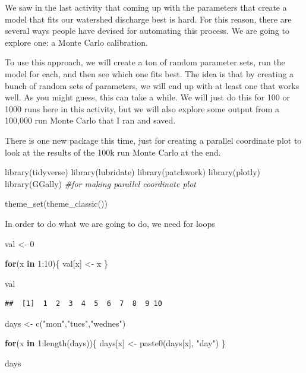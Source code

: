 \documentclass[
]{book}
\newenvironment{Shaded}{\begin{snugshade}}{\end{snugshade}}
\newcommand{\CommentTok}[1]{\textcolor[rgb]{0.56,0.35,0.01}{\textit{#1}}}
\newcommand{\ControlFlowTok}[1]{\textcolor[rgb]{0.13,0.29,0.53}{\textbf{#1}}}
\newcommand{\DecValTok}[1]{\textcolor[rgb]{0.00,0.00,0.81}{#1}}
\newcommand{\FunctionTok}[1]{\textcolor[rgb]{0.00,0.00,0.00}{#1}}
\newcommand{\NormalTok}[1]{#1}
\newcommand{\OtherTok}[1]{\textcolor[rgb]{0.56,0.35,0.01}{#1}}
\newcommand{\SpecialCharTok}[1]{\textcolor[rgb]{0.00,0.00,0.00}{#1}}
\newcommand{\StringTok}[1]{\textcolor[rgb]{0.31,0.60,0.02}{#1}}
\begin{document}
We saw in the last activity that coming up with the parameters that create a model that fits our watershed discharge best is hard. For this reason, there are several ways people have devised for automating this process. We are going to explore one: a Monte Carlo calibration.

To use this approach, we will create a ton of random parameter sets, run the model for each, and then see which one fits best. The idea is that by creating a bunch of random sets of parameters, we will end up with at least one that works well. As you might guess, this can take a while. We will just do this for 100 or 1000 runs here in this activity, but we will also explore some output from a 100,000 run Monte Carlo that I ran and saved.

There is one new package this time, just for creating a parallel coordinate plot to look at the results of the 100k run Monte Carlo at the end.

\begin{Shaded}
\begin{Highlighting}[]
\FunctionTok{library}\NormalTok{(tidyverse)}
\FunctionTok{library}\NormalTok{(lubridate)}
\FunctionTok{library}\NormalTok{(patchwork)}
\FunctionTok{library}\NormalTok{(plotly)}
\FunctionTok{library}\NormalTok{(GGally) }\CommentTok{\#for making parallel coordinate plot}

\FunctionTok{theme\_set}\NormalTok{(}\FunctionTok{theme\_classic}\NormalTok{())}
\end{Highlighting}
\end{Shaded}

In order to do what we are going to do, we need for loops

\begin{Shaded}
\begin{Highlighting}[]
\NormalTok{val }\OtherTok{\textless{}{-}} \DecValTok{0}

\ControlFlowTok{for}\NormalTok{(x }\ControlFlowTok{in} \DecValTok{1}\SpecialCharTok{:}\DecValTok{10}\NormalTok{)\{}
\NormalTok{  val[x] }\OtherTok{\textless{}{-}}\NormalTok{ x}
\NormalTok{\}}

\NormalTok{val}
\end{Highlighting}
\end{Shaded}

\begin{verbatim}
##  [1]  1  2  3  4  5  6  7  8  9 10
\end{verbatim}

\begin{Shaded}
\begin{Highlighting}[]
\NormalTok{days }\OtherTok{\textless{}{-}} \FunctionTok{c}\NormalTok{(}\StringTok{"mon"}\NormalTok{,}\StringTok{"tues"}\NormalTok{,}\StringTok{"wednes"}\NormalTok{)}

\ControlFlowTok{for}\NormalTok{(x }\ControlFlowTok{in} \DecValTok{1}\SpecialCharTok{:}\FunctionTok{length}\NormalTok{(days))\{}
\NormalTok{  days[x] }\OtherTok{\textless{}{-}} \FunctionTok{paste0}\NormalTok{(days[x], }\StringTok{"day"}\NormalTok{)}
\NormalTok{\}}

\NormalTok{days}
\end{Highlighting}
\end{Shaded}
\end{document}
